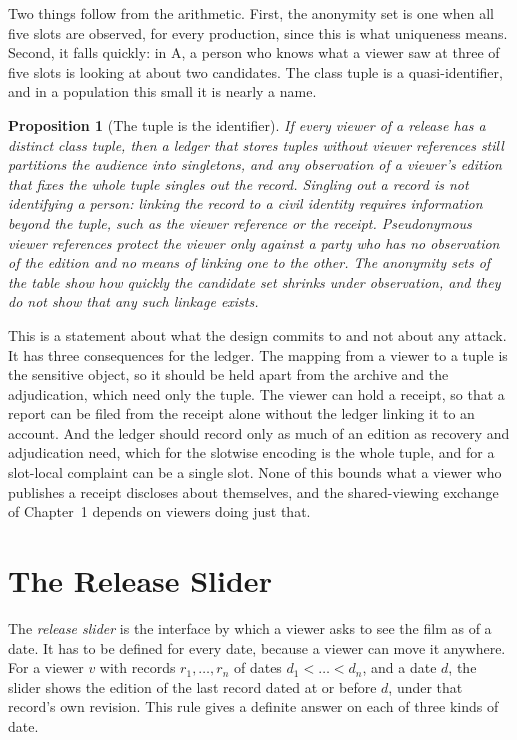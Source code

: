 \documentclass[11pt,twoside,openright]{book}
\theoremstyle{plain}
\newtheorem{proposition}[theorem]{Proposition}
\theoremstyle{definition}
\theoremstyle{remark}
\begin{document}
Two things follow from the arithmetic. First, the anonymity set is one when all five slots are observed, for every production, since this is what uniqueness means. Second, it falls quickly: in A, a person who knows what a viewer saw at three of five slots is looking at about two candidates. The class tuple is a quasi-identifier, and in a population this small it is nearly a name.

\begin{proposition}[The tuple is the identifier]\label{prop:ident}
If every viewer of a release has a distinct class tuple, then a ledger that stores tuples without viewer references still partitions the audience into singletons, and any observation of a viewer's edition that fixes the whole tuple singles out the record. Singling out a record is not identifying a person: linking the record to a civil identity requires information beyond the tuple, such as the viewer reference or the receipt. Pseudonymous viewer references protect the viewer only against a party who has no observation of the edition and no means of linking one to the other. The anonymity sets of the table show how quickly the candidate set shrinks under observation, and they do not show that any such linkage exists.
\end{proposition}

This is a statement about what the design commits to and not about any attack. It has three consequences for the ledger. The mapping from a viewer to a tuple is the sensitive object, so it should be held apart from the archive and the adjudication, which need only the tuple. The viewer can hold a receipt, so that a report can be filed from the receipt alone without the ledger linking it to an account. And the ledger should record only as much of an edition as recovery and adjudication need, which for the slotwise encoding is the whole tuple, and for a slot-local complaint can be a single slot. None of this bounds what a viewer who publishes a receipt discloses about themselves, and the shared-viewing exchange of Chapter~1 depends on viewers doing just that.

\section{The Release Slider}\label{sec:slider}

The \emph{release slider} is the interface by which a viewer asks to see the film as of a date. It has to be defined for every date, because a viewer can move it anywhere. For a viewer $v$ with records $r_1,\dots,r_n$ of dates $d_1<\dots<d_n$, and a date $d$, the slider shows the edition of the last record dated at or before $d$, under that record's own revision. This rule gives a definite answer on each of three kinds of date.
\end{document}
